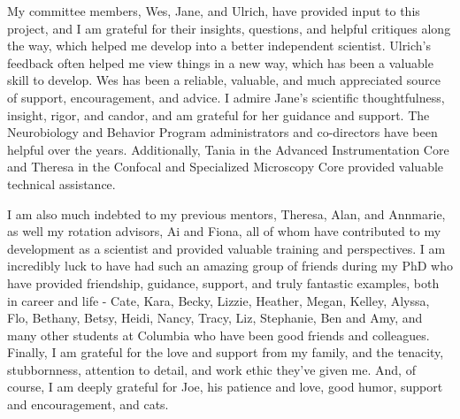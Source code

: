 My committee members, Wes, Jane, and Ulrich, have provided input to this project, and I am grateful for their insights, questions, and helpful critiques along the way, which helped me develop into a better independent scientist.
Ulrich's feedback often helped me view things in a new way, which has been a valuable skill to develop. 
Wes has been a reliable, valuable, and much appreciated source of support, encouragement, and advice.
I admire Jane's scientific thoughtfulness, insight, rigor, and candor, and am grateful for her guidance and support.
The Neurobiology and Behavior Program administrators and co-directors have been helpful over the years.
Additionally, Tania in the Advanced Instrumentation Core and Theresa in the Confocal and Specialized Microscopy Core provided valuable technical assistance.

I am also much indebted to my previous mentors, Theresa, Alan, and Annmarie, as well my rotation advisors, Ai and Fiona, all of whom have contributed to my development as a scientist and provided valuable training and perspectives.
I am incredibly luck to have had such an amazing group of friends during my PhD who have provided friendship, guidance, support, and truly fantastic examples, both in career and life - Cate, Kara, Becky, Lizzie, Heather, Megan, Kelley, Alyssa, Flo, Bethany, Betsy, Heidi, Nancy, Tracy, Liz, Stephanie, Ben and Amy, and many other students at Columbia who have been good friends and colleagues.
Finally, I am grateful for the love and support from my family, and the tenacity, stubbornness, attention to detail, and work ethic they've given me.
And, of course, I am deeply grateful for Joe, his patience and love, good humor, support and encouragement, and cats.
